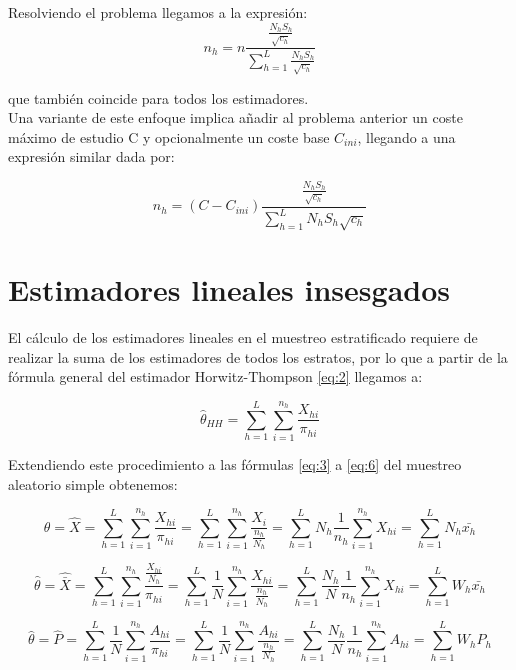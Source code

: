 Resolviendo el problema llegamos a la expresión:
\begin{equation}
    n_h = n\frac{\frac{N_hS_h}{\sqrt{c_h}}}{\sum\limits_{h=1}^L\frac{N_hS_h}{\sqrt{c_h}}}
\end{equation}

que también coincide para todos los estimadores.\\

Una variante de este enfoque implica añadir al problema anterior un coste máximo de estudio C y opcionalmente un coste base $C_{ini}$, llegando a una expresión similar dada por:

\begin{equation}
    n_h = (C-C_{ini})\frac{\frac{N_hS_h}{\sqrt{c_h}}}{\sum\limits_{h=1}^LN_hS_h\sqrt{c_h}}
\end{equation}

\section{Estimadores lineales insesgados} \label{sect:4.2}
El cálculo de los estimadores lineales en el muestreo estratificado requiere de realizar la suma de los estimadores de todos los estratos, por lo que a partir de la fórmula general del estimador Horwitz-Thompson \ref{eq:2} llegamos a:

\begin{equation}
    \hat{\theta}_{HH} = \sum_{h=1}^{L}\sum_{i=1}^{n_h}\frac{X_{hi}}{\pi_{hi}}
\end{equation}

Extendiendo este procedimiento a las fórmulas \ref{eq:3} a \ref{eq:6} del muestreo aleatorio simple obtenemos:

\begin{equation}
    \hat{\theta} = \hat{X} = \sum_{h=1}^{L}\sum_{i=1}^{n_h}\frac{X_{hi}}{\pi_{hi}} = \sum_{h=1}^{L}\sum_{i=1}^{n_h}\frac{X_{i}}{\frac{n_h}{N_h}} = \sum_{h=1}^{L}N_h\frac{1}{n_h}\sum_{i=1}^{n_h}X_{hi} = \sum_{h=1}^{L}N_h\bar{x_h}
\end{equation}

\begin{equation}
    \hat{\theta} = \hat{\bar{X}} = \sum_{h=1}^{L}\sum_{i=1}^{n_h}\frac{\frac{X_{hi}}{N_h}}{\pi_{hi}} = \sum_{h=1}^{L}\frac{1}{N}\sum_{i=1}^{n_h}\frac{X_{hi}}{\frac{n_h}{N_h}} = \sum_{h=1}^{L}\frac{N_h}{N}\frac{1}{n_h}\sum_{i=1}^{n_h}X_{hi} = \sum_{h=1}^{L}W_h\bar{x_h}
\end{equation}

\begin{equation}
    \hat{\theta} = \hat{P} = \sum_{h=1}^{L}\frac{1}{N}\sum_{i=1}^{n_h}\frac{A_{hi}}{\pi_{hi}} = \sum_{h=1}^{L}\frac{1}{N}\sum_{i=1}^{n_h}\frac{A_{hi}}{\frac{n_h}{N_h}} = \sum_{h=1}^{L}\frac{N_h}{N}\frac{1}{n_h}\sum_{i=1}^{n_h}A_{hi} = \sum_{h=1}^{L}W_hP_h
\end{equation}

